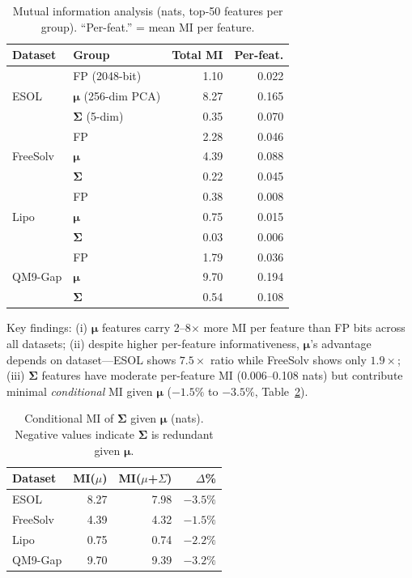 \documentclass[sigconf]{acmart}
\begin{document}
\begin{table}[ht]
\caption{Mutual information analysis (nats, top-50 features per group). ``Per-feat.'' = mean MI per feature.}
\label{tab:mi}
\centering
\small
\begin{tabular}{@{}llrr@{}}
\toprule
Dataset & Group & Total MI & Per-feat. \\
\midrule
\multirow{3}{*}{ESOL} & FP (2048-bit) & 1.10 & 0.022 \\
                       & $\boldsymbol{\mu}$ (256-dim PCA) & 8.27 & 0.165 \\
                       & $\boldsymbol{\Sigma}$ (5-dim) & 0.35 & 0.070 \\
\midrule
\multirow{3}{*}{FreeSolv} & FP & 2.28 & 0.046 \\
                           & $\boldsymbol{\mu}$ & 4.39 & 0.088 \\
                           & $\boldsymbol{\Sigma}$ & 0.22 & 0.045 \\
\midrule
\multirow{3}{*}{Lipo} & FP & 0.38 & 0.008 \\
                       & $\boldsymbol{\mu}$ & 0.75 & 0.015 \\
                       & $\boldsymbol{\Sigma}$ & 0.03 & 0.006 \\
\midrule
\multirow{3}{*}{QM9-Gap} & FP & 1.79 & 0.036 \\
                          & $\boldsymbol{\mu}$ & 9.70 & 0.194 \\
                          & $\boldsymbol{\Sigma}$ & 0.54 & 0.108 \\
\bottomrule
\end{tabular}
\end{table}

Key findings: (i) $\boldsymbol{\mu}$ features carry 2--8$\times$ more MI per feature than FP bits across all datasets; (ii) despite higher per-feature informativeness, $\boldsymbol{\mu}$'s advantage depends on dataset---ESOL shows $7.5\times$ ratio while FreeSolv shows only $1.9\times$; (iii) $\boldsymbol{\Sigma}$ features have moderate per-feature MI (0.006--0.108 nats) but contribute minimal \emph{conditional} MI given $\boldsymbol{\mu}$ ($-1.5\%$ to $-3.5\%$, Table~\ref{tab:cmi}).

\begin{table}[ht]
\caption{Conditional MI of $\boldsymbol{\Sigma}$ given $\boldsymbol{\mu}$ (nats). Negative values indicate $\boldsymbol{\Sigma}$ is redundant given $\boldsymbol{\mu}$.}
\label{tab:cmi}
\centering
\small
\begin{tabular}{@{}lrrr@{}}
\toprule
Dataset & MI($\mu$) & MI($\mu$+$\Sigma$) & $\Delta$\% \\
\midrule
ESOL     & 8.27 & 7.98 & $-3.5\%$ \\
FreeSolv & 4.39 & 4.32 & $-1.5\%$ \\
Lipo     & 0.75 & 0.74 & $-2.2\%$ \\
QM9-Gap  & 9.70 & 9.39 & $-3.2\%$ \\
\bottomrule
\end{tabular}
\end{table}
\end{document}
